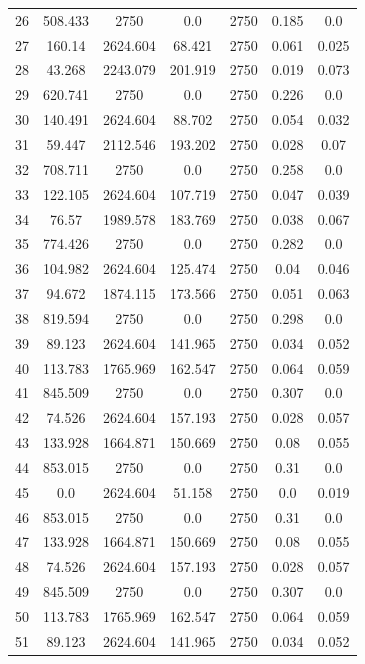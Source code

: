 \documentclass[]{article}
\begin{document}
\begin{longtable}{lcccccc}
		26 & 508.433 & 2750 & 0.0 & 2750 & 0.185 & 0.0           \\
		27 & 160.14 & 2624.604 & 68.421 & 2750 & 0.061 & 0.025   \\
		28 & 43.268 & 2243.079 & 201.919 & 2750 & 0.019 & 0.073  \\
		29 & 620.741 & 2750 & 0.0 & 2750 & 0.226 & 0.0           \\
		30 & 140.491 & 2624.604 & 88.702 & 2750 & 0.054 & 0.032  \\
		31 & 59.447 & 2112.546 & 193.202 & 2750 & 0.028 & 0.07   \\
		32 & 708.711 & 2750 & 0.0 & 2750 & 0.258 & 0.0           \\
		33 & 122.105 & 2624.604 & 107.719 & 2750 & 0.047 & 0.039 \\
		34 & 76.57 & 1989.578 & 183.769 & 2750 & 0.038 & 0.067   \\
		35 & 774.426 & 2750 & 0.0 & 2750 & 0.282 & 0.0           \\
		36 & 104.982 & 2624.604 & 125.474 & 2750 & 0.04 & 0.046  \\
		37 & 94.672 & 1874.115 & 173.566 & 2750 & 0.051 & 0.063  \\
		38 & 819.594 & 2750 & 0.0 & 2750 & 0.298 & 0.0           \\
		39 & 89.123 & 2624.604 & 141.965 & 2750 & 0.034 & 0.052  \\
		40 & 113.783 & 1765.969 & 162.547 & 2750 & 0.064 & 0.059 \\
		41 & 845.509 & 2750 & 0.0 & 2750 & 0.307 & 0.0           \\
		42 & 74.526 & 2624.604 & 157.193 & 2750 & 0.028 & 0.057  \\
		43 & 133.928 & 1664.871 & 150.669 & 2750 & 0.08 & 0.055  \\
		44 & 853.015 & 2750 & 0.0 & 2750 & 0.31 & 0.0            \\
		45 & 0.0 & 2624.604 & 51.158 & 2750 & 0.0 & 0.019        \\
		46 & 853.015 & 2750 & 0.0 & 2750 & 0.31 & 0.0            \\
		47 & 133.928 & 1664.871 & 150.669 & 2750 & 0.08 & 0.055  \\
		48 & 74.526 & 2624.604 & 157.193 & 2750 & 0.028 & 0.057  \\
		49 & 845.509 & 2750 & 0.0 & 2750 & 0.307 & 0.0           \\
		50 & 113.783 & 1765.969 & 162.547 & 2750 & 0.064 & 0.059 \\
		51 & 89.123 & 2624.604 & 141.965 & 2750 & 0.034 & 0.052  \\

\end{longtable}
\end{document}
